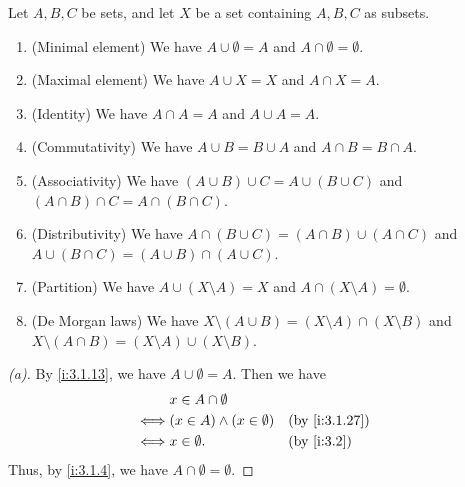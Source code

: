\begin{prop}\label{i:3.1.28}
  Let \(A, B, C\) be sets, and let \(X\) be a set containing \(A, B, C\) as subsets.
  \begin{enumerate}
    \item (Minimal element) We have \(A \cup \emptyset = A\) and \(A \cap \emptyset = \emptyset\).
    \item (Maximal element) We have \(A \cup X = X\) and \(A \cap X = A\).
    \item (Identity) We have \(A \cap A = A\) and \(A \cup A = A\).
    \item (Commutativity) We have \(A \cup B = B \cup A\) and \(A \cap B = B \cap A\).
    \item (Associativity) We have \((A \cup B) \cup C = A \cup (B \cup C)\) and \((A \cap B) \cap C = A \cap (B \cap C)\).
    \item (Distributivity) We have \(A \cap (B \cup C) = (A \cap B) \cup (A \cap C)\) and \(A \cup (B \cap C) = (A \cup B) \cap (A \cup C)\).
    \item (Partition) We have \(A \cup (X \setminus A) = X\) and \(A \cap (X \setminus A) = \emptyset\).
    \item (De Morgan laws) We have \(X \setminus (A \cup B) = (X \setminus A) \cap (X \setminus B)\) and \(X \setminus (A \cap B) = (X \setminus A) \cup (X \setminus B)\).
  \end{enumerate}
\end{prop}

\begin{proof}[(a)]
  By \cref{i:3.1.13}, we have \(A \cup \emptyset = A\).
  Then we have
  \begin{align*}
         & x \in A \cap \emptyset                               \\
    \iff & (x \in A) \land (x \in \emptyset) &  & \by{i:3.1.27} \\
    \iff & x \in \emptyset.                  &  & \by{i:3.2}
  \end{align*}
  Thus, by \cref{i:3.1.4}, we have \(A \cap \emptyset = \emptyset\).
\end{proof}

